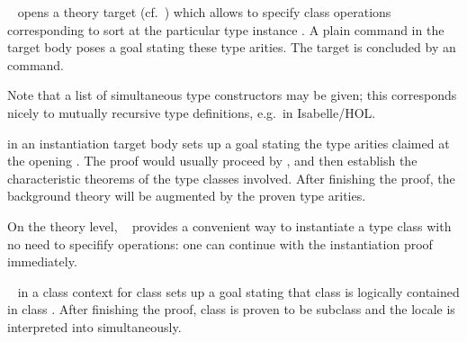 \begin{isabellebody}
\begin{isamarkuptext}
\begin{description}
  \item \hyperlink{command.instantiation}{\mbox{}}~ opens a theory target (cf.\ ) which
  allows to specify class operations  corresponding
  to sort  at the particular type instance .  A plain \hyperlink{command.instance}{\mbox{}} command in the
  target body poses a goal stating these type arities.  The target is
  concluded by an \hyperlink{command.local.end}{\mbox{}} command.

  Note that a list of simultaneous type constructors may be given;
  this corresponds nicely to mutually recursive type definitions, e.g.\
  in Isabelle/HOL.

  \item \hyperlink{command.instance}{\mbox{}} in an instantiation target body sets
  up a goal stating the type arities claimed at the opening \hyperlink{command.instantiation}{\mbox{}}.  The proof would usually proceed by \hyperlink{method.intro-classes}{\mbox{}}, and then establish the characteristic theorems of
  the type classes involved.  After finishing the proof, the
  background theory will be augmented by the proven type arities.

  On the theory level, \hyperlink{command.instance}{\mbox{}}~ provides a convenient way to instantiate a type class with no
  need to specifify operations: one can continue with the
  instantiation proof immediately.

  \item \hyperlink{command.subclass}{\mbox{}}~ in a class context for class
   sets up a goal stating that class  is logically
  contained in class .  After finishing the proof, class
  \isa{d} is proven to be subclass  and the locale \isa{c} is interpreted into  simultaneously.


\end{description}
\end{isamarkuptext}
\end{isabellebody}
